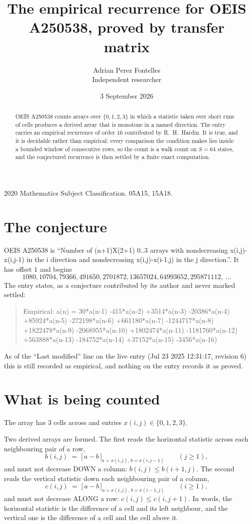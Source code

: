 \documentclass[11pt,a4paper]{article}
\title{The empirical recurrence for OEIS A250538, proved by transfer matrix}
\author{Adrian Perez Fontelles\\ \small Independent researcher}
\date{3 September 2026}
\theoremstyle{plain}
\theoremstyle{definition}
\begin{document}
\maketitle

\begin{abstract}
OEIS A250538 counts arrays over $\{0,1,2,3\}$ in which a statistic taken over short runs
of cells produces a derived array that is monotone in a named direction. The entry carries an
empirical recurrence of order $16$ contributed by R.~H.~Hardin. It is true, and it is
decidable rather than empirical: every comparison the condition makes lies inside a bounded
window of consecutive rows, so the count is a walk count on $S=64$ states, and the
conjectured recurrence is then settled by a finite exact computation.
\end{abstract}

\noindent\small 2020 Mathematics Subject Classification. 05A15, 15A18.\normalsize

\section{The conjecture}

OEIS A250538 is ``Number of (n+1)X(2+1) 0..3 arrays with nondecreasing x(i,j)-x(i,j-1) in the i direction and nondecreasing x(i,j)-x(i-1,j) in the j direction.''. It has offset $1$ and begins
\[
1080, 10704, 79366, 491650, 2701872, 13657024, 64993652, 295871112,\ \dots
\]
The entry states, as a conjecture contributed by its author and never marked settled:
\begin{quote}
Empirical: a(n) = 30*a(n-1) -415*a(n-2) +3514*a(n-3) -20386*a(n-4) +85924*a(n-5) -272198*a(n-6) +661180*a(n-7) -1244717*a(n-8) +1822478*a(n-9) -2068955*a(n-10) +1802474*a(n-11) -1181760*a(n-12) +563888*a(n-13) -184752*a(n-14) +37152*a(n-15) -3456*a(n-16)
\end{quote}
As of the ``Last modified'' line on the live entry (Jul 23 2025 12:31:17, revision 6) this is still
recorded as empirical, and nothing on the entry records it as proved.

\section{What is being counted}

The array has $3$ cells across and entries $x(i,j)\in\{0,1,2,3\}$.

Two derived arrays are formed. The first reads the horizontal statistic across each
neighbouring pair of a row,
\[
b(i,j)\;=\;\bigl[\,a-b\,\bigr]_{a=x(i,j),\,b=x(i,j-1)}\qquad (j\ge1),
\]
and must not decrease DOWN a column: $b(i,j)\le b(i{+}1,j)$. The second reads the vertical
statistic down each neighbouring pair of a column,
\[
c(i,j)\;=\;\bigl[\,a-b\,\bigr]_{a=x(i,j),\,b=x(i{-}1,j)}\qquad (i\ge1),
\]
and must not decrease ALONG a row: $c(i,j)\le c(i,j{+}1)$. In words, the horizontal statistic
is the difference of a cell and its left neighbour, and the vertical one is
the difference of a cell and the cell above it.
\end{document}
